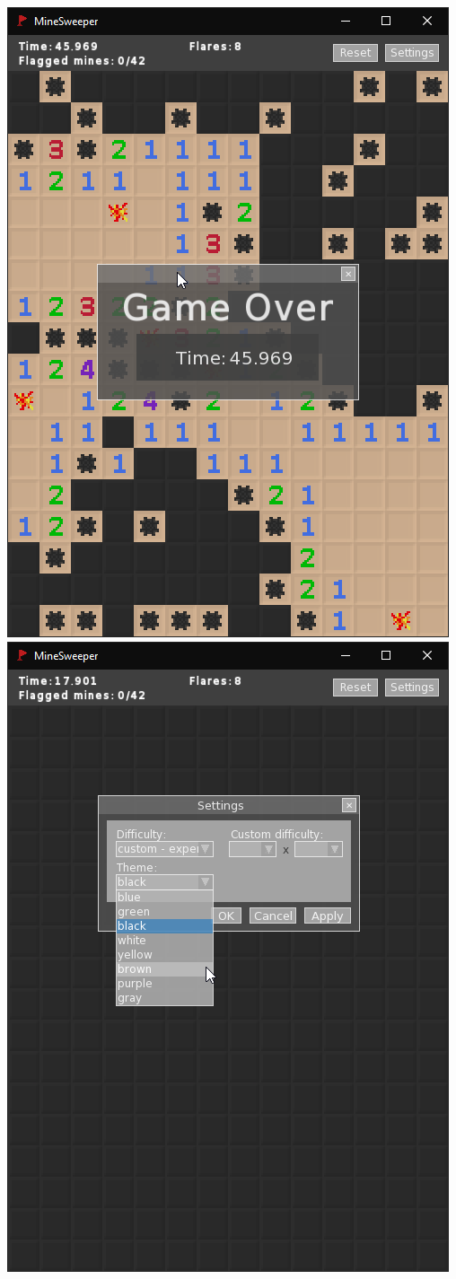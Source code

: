 \documentclass[12pt,a4paper]{article}
\begin{document}
\includegraphics[scale=0.45]{gameOver}
\includegraphics[scale=0.45]{settings}
\end{document}
